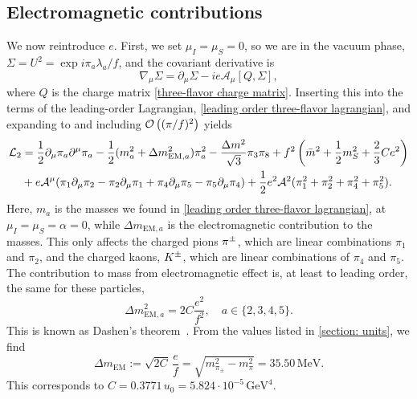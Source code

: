 \subsection{Electromagnetic contributions}

We now reintroduce $e$.
First, we set $\mu_I = \mu_S = 0$, so we are in the vacuum phase, $\Sigma = U^2 = \exp{i \pi_a \lambda_a/f}$, and the covariant derivative is
%
\begin{equation}
    \nabla_\mu \Sigma = \partial_\mu \Sigma - i e \mathcal A_\mu [Q, \Sigma],
\end{equation}
%
where $Q$ is the charge matrix \autoref{three-flavor charge matrix}.
Inserting this into the terms of the leading-order Lagrangian, \autoref{leading order three-flavor lagrangian}, and expanding to and including $\mathcal O\left((\pi/f)^2\right)$ yields
%
\begin{align}
    \nonumber
    \mathcal{L}_2
    &= 
    \frac{1}{2} \partial_\mu \pi_a \partial^\mu \pi_a
    - \frac{1}{2}(m_{a}^2 + \Delta m_{\text{EM},a}^2)\pi_a^2
    - \frac{\Delta m^2}{\sqrt 3} \pi_3 \pi_8
    + f^2 \left(\bar m^2 + \frac{1}{2} m_S^2 + \frac{2}{3}C e^2\right)\\
    &+ e \mathcal A^\mu 
    (
        \pi_1 \partial_\mu \pi_2 
        - \pi_2 \partial_\mu \pi_1 
        + \pi_4 \partial_\mu \pi_5 
        - \pi_5 \partial_\mu \pi_4
    )
    + \frac{1}{2} e^2 \mathcal A^2 (\pi_1^2 +\pi_2^2 + \pi_4^2 +\pi_5^2).
\end{align}
%
Here, $m_{a}$ is the masses  we found in \autoref{leading order three-flavor lagrangian}, at $\mu_I = \mu_S = \alpha = 0$, while $\Delta m_{\text{EM}, a}$ is the electromagnetic contribution to the masses.
This only affects the charged pions ${\pi^\pm}$, which are linear combinations $\pi_1$ and $\pi_2$, and the charged kaons, ${K^\pm}$, which are linear combinations of $\pi_4$ and $\pi_5$.
The contribution to mass from electromagnetic effect is, at least to leading order, the same for these particles,
%
\begin{equation}
    \Delta m_{\text{EM}, a}^2 = 2C \frac{e^2}{f^2}, \quad a \in \{2, 3, 4, 5\}.
\end{equation}
%
This is known as Dashen's theorem~\autocite{dashenChiralMathrmSUEnsuremath1969}.
From the values listed in \autoref{section: units}, we find
%
\begin{equation}
    \label{EM mass contribtuion leading order}
    \Delta m_{\text{EM}} := \sqrt{2C} \, \frac{e}{f} 
    = \sqrt{m_{\pi_\pm}^2 - m_{\pi}^2} = 35.50 \, \text{MeV}.
\end{equation}
%
This corresponds to $C = 0.3771 \, u_0 = 5.824 \cdot 10^{-5} \, \text{GeV}^4$.

